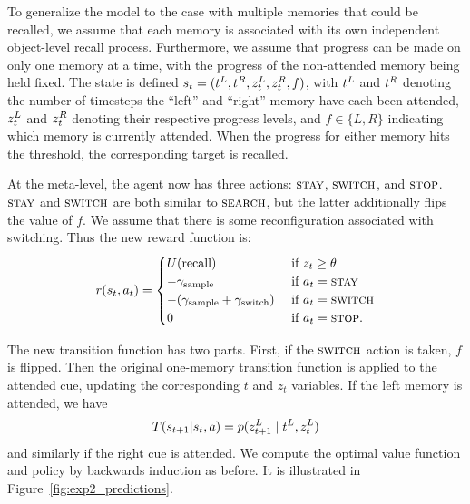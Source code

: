 
To generalize the model to the case with multiple memories that could be recalled, we assume that each memory is associated with its own independent object-level recall process. Furthermore, we assume that progress can be made on only one memory at a time, with the progress of the non-attended memory being held fixed. The state is defined $s_t = (t^{L}, t^{R}, z_t^{L}, z_t^{R}, f)$, with $t^{L}$ and $t^{R}$ denoting the number of timesteps the ``left'' and ``right'' memory have each been attended, $z_t^{L}$ and $z_t^{R}$ denoting their respective progress levels, and $f \in \{L, R\}$ indicating which memory is currently attended. When the progress for either memory hits the threshold, the corresponding target is recalled.

At the meta-level, the agent now has three actions: $\textsc{stay}$, $\textsc{switch}$, and $\textsc{stop}$. $\textsc{stay}$ and $\textsc{switch}$ are both similar to $\textsc{search}$, but the latter additionally flips the value of $f$. We assume that there is some reconfiguration associated with switching. Thus the new reward function is:
%
\begin{equation}\label{eq:reward2}
  r(s_t, a_t) = \begin{cases} 
    U({\text{recall}}) & \text{ if } z_t \geq \theta \\
    -\gamma_\text{sample} & \text{ if } a_t = \textsc{stay} \\
    -(\gamma_\text{sample} + \gamma_\text{switch})  & \text{ if } a_t = \textsc{switch} \\
    0 & \text{ if } a_t = \textsc{stop}.
  \end{cases}
\end{equation}

The new transition function has two parts. First, if the $\textsc{switch}$ action is taken, $f$ is flipped. Then the original one-memory transition function is applied to the attended cue, updating the corresponding $t$ and $z_t$ variables. If the left memory is attended, we have
%
\begin{equation}\label{eq:transition2}
  T(s_{t+1} | s_t, a) = p(z_{t+1}^{L} \mid t^{L}, z_t^{L})
\end{equation}
and similarly if the right cue is attended. We compute the optimal value function and policy by backwards induction as before. It is illustrated in Figure~\ref{fig:exp2_predictions}.


